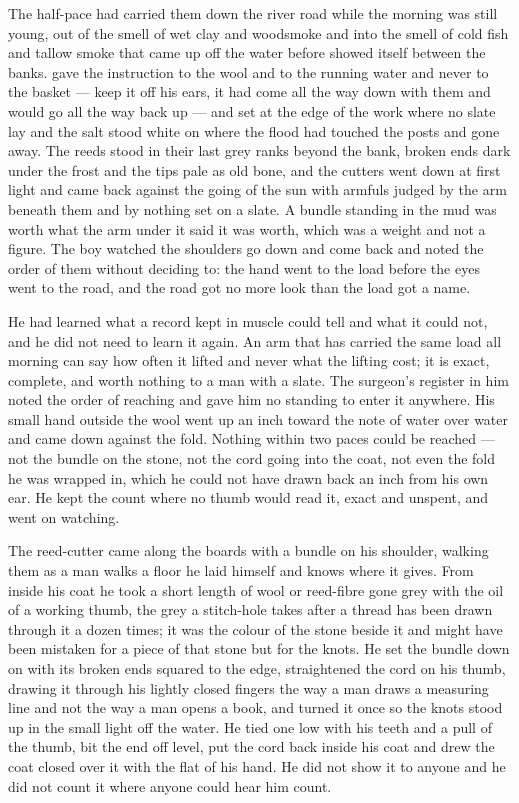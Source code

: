 The half-pace had carried them down the river road while the morning was still young, out of the smell of wet clay and woodsmoke and into the smell of cold fish and tallow smoke that came up off the water before  showed itself between the banks.  gave the instruction to the wool and to the running water and never to the basket --- keep it off his ears, it had come all the way down with them and would go all the way back up --- and set  at the edge of the work where no slate lay and the salt stood white on  where the flood had touched the posts and gone away. The reeds stood in their last grey ranks beyond the bank, broken ends dark under the frost and the tips pale as old bone, and the cutters went down at first light and came back against the going of the sun with armfuls judged by the arm beneath them and by nothing set on a slate. A bundle standing in the mud was worth what the arm under it said it was worth, which was a weight and not a figure. The boy watched the shoulders go down and come back and noted the order of them without deciding to: the hand went to the load before the eyes went to the road, and the road got no more look than the load got a name.

He had learned what a record kept in muscle could tell and what it could not, and he did not need to learn it again. An arm that has carried the same load all morning can say how often it lifted and never what the lifting cost; it is exact, complete, and worth nothing to a man with a slate. The surgeon's register in him noted the order of reaching and gave him no standing to enter it anywhere. His small hand outside the wool went up an inch toward the note of water over water and came down against the fold. Nothing within two paces could be reached --- not the bundle on the stone, not the cord going into the coat, not even the fold he was wrapped in, which he could not have drawn back an inch from his own ear. He kept the count where no  thumb would read it, exact and unspent, and went on watching.

The reed-cutter came along the boards with a bundle on his shoulder, walking them as a man walks a floor he laid himself and knows where it gives. From inside his coat he took a short length of wool or reed-fibre gone grey with the oil of a working thumb, the grey a stitch-hole takes after a thread has been drawn through it a dozen times; it was the colour of the stone beside it and might have been mistaken for a piece of that stone but for the knots. He set the bundle down on  with its broken ends squared to the edge, straightened the cord on his thumb, drawing it through his lightly closed fingers the way a man draws a measuring line and not the way a man opens a book, and turned it once so the knots stood up in the small light off the water. He tied one low with his teeth and a pull of the thumb, bit the end off level, put the cord back inside his coat and drew the coat closed over it with the flat of his hand. He did not show it to anyone and he did not count it where anyone could hear him count.

